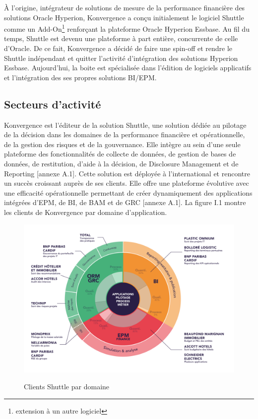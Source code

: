 \begin{spacing}{1.2}
À l'origine, intégrateur de solutions de mesure de la performance financière des solutions Oracle Hyperion, Konvergence a conçu initialement le logiciel Shuttle comme un Add-On\footnote{extension à un autre logiciel} renforçant la plateforme Oracle Hyperion Essbase. Au fil du temps, Shuttle est devenu une plateforme à part entière\cite{shuttle}, concurrente de celle d'Oracle. De ce fait, Konvergence a décidé de faire une spin-off et rendre le Shuttle indépendant et quitter l'activité d'intégration des solutions Hyperion Essbase. 
Aujourd'hui, la boite est spécialisée dans l’édition de logiciels applicatifs et l'intégration des ses propres solutions BI/EPM.

\subsection{Secteurs d'activité}
Konvergence est l’éditeur de la solution Shuttle, une solution dédiée au pilotage de la décision dans les domaines de la performance financière et opérationnelle, de la gestion des risques et de la gouvernance. Elle intègre au sein d’une seule plateforme des fonctionnalités de collecte de données, de gestion de bases de données, de restitution, d'aide à la décision, de Disclosure Management et de Reporting  [annexe A.1]. Cette solution est déployée à l’international et rencontre un succès croissant auprès de ses clients. Elle offre une plateforme évolutive avec une efficacité opérationnelle permettant de créer dynamiquement des applications intégrées d'EPM, de BI, de BAM et de GRC [annexe A.1]. 
La figure I.1 montre les clients de Konvergence par domaine d'application.
\begin{figure}[H]\centering 
	\includegraphics[scale=0.5]{solutions}
	\caption{Clients Shuttle par domaine}\cite{intern}
	\label{fig:fig2}
\end{figure}


\end{spacing}
